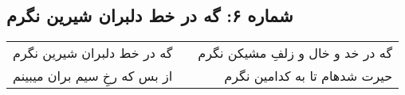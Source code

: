 \begin{center}
\section*{شماره ۶: گه در خط دلبران شیرین نگرم}
\label{sec:006}
\begin{longtable}{l p{0.5cm} r}
گه در خط دلبران شیرین نگرم
&&
گه در خد و خال و زلفِ مشیکن نگرم
\\
از بس که رخِ سیم بران میبینم
&&
حیرت شدهام تا به کدامین نگرم
\\
\end{longtable}
\end{center}
